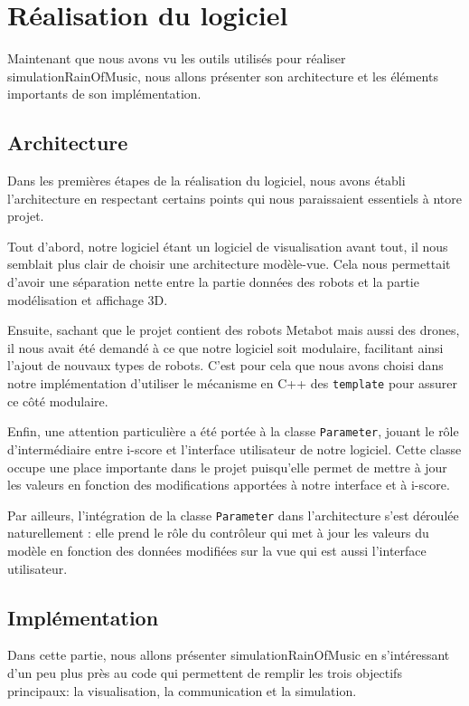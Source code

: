 \section{Réalisation du logiciel}

Maintenant que nous avons vu les outils utilisés pour réaliser simulationRainOfMusic, nous allons présenter son architecture et les éléments importants de son implémentation.

\subsection{Architecture}
Dans les premières étapes de la réalisation du logiciel, nous avons établi l'architecture en respectant certains points qui nous paraissaient essentiels à ntore projet.

Tout d'abord, notre logiciel étant un logiciel de visualisation avant tout, il nous semblait plus clair de choisir une architecture modèle-vue. Cela nous permettait d'avoir une séparation nette entre la partie données des robots et la partie modélisation et affichage 3D. 

Ensuite, sachant que le projet contient des robots Metabot mais aussi des drones, il nous avait été demandé à ce que notre logiciel soit modulaire, facilitant ainsi l'ajout de nouvaux types de robots. C'est pour cela que nous avons choisi dans notre implémentation d'utiliser le mécanisme en C++ des \verb|template| pour assurer ce côté modulaire.

Enfin, une attention particulière a été portée à la classe \verb|Parameter|, jouant le rôle d'intermédiaire entre i-score et l'interface utilisateur de notre logiciel. Cette classe occupe une place importante dans le projet puisqu'elle permet de mettre à jour les valeurs en fonction des modifications apportées à notre interface et à i-score.

Par ailleurs, l'intégration de la classe \verb|Parameter| dans l'architecture s'est déroulée naturellement : elle prend le rôle du contrôleur qui met à jour les valeurs du modèle en fonction des données modifiées sur la vue qui est aussi l'interface utilisateur.

		
\subsection{Implémentation}

Dans cette partie, nous allons présenter simulationRainOfMusic en s'intéressant d'un peu plus près au code qui permettent de remplir les trois objectifs principaux: la visualisation, la communication et la simulation.


